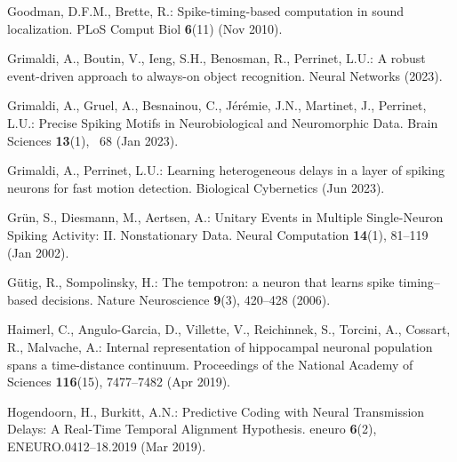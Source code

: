 \documentclass[runningheads]{llncs}
\begin{document}
\begin{thebibliography}{10}
  Goodman, D.F.M., Brette, R.: Spike-timing-based computation in sound localization. PLoS Comput Biol  \textbf{6}(11) (Nov 2010). %
  
  Grimaldi, A., Boutin, V., Ieng, S.H., Benosman, R., Perrinet, L.U.: A robust event-driven approach to always-on object recognition. Neural Networks  (2023). %
  
  Grimaldi, A., Gruel, A., Besnainou, C., Jérémie, J.N., Martinet, J., Perrinet, L.U.: Precise {Spiking} {Motifs} in {Neurobiological} and {Neuromorphic} {Data}. Brain Sciences  \textbf{13}(1), ~68 (Jan 2023). %
  
  Grimaldi, A., Perrinet, L.U.: Learning heterogeneous delays in a layer of spiking neurons for fast motion detection. Biological Cybernetics  (Jun 2023). %
  
  Grün, S., Diesmann, M., Aertsen, A.: Unitary {Events} in {Multiple} {Single}-{Neuron} {Spiking} {Activity}: {II}. {Nonstationary} {Data}. Neural Computation  \textbf{14}(1),  81--119 (Jan 2002). %
  
  Gütig, R., Sompolinsky, H.: The tempotron: a neuron that learns spike timing–based decisions. Nature Neuroscience  \textbf{9}(3),  420--428 (2006). %
  
  Haimerl, C., Angulo-Garcia, D., Villette, V., Reichinnek, S., Torcini, A., Cossart, R., Malvache, A.: Internal representation of hippocampal neuronal population spans a time-distance continuum. Proceedings of the National Academy of Sciences  \textbf{116}(15),  7477--7482 (Apr 2019). %
  
  Hogendoorn, H., Burkitt, A.N.: Predictive {Coding} with {Neural} {Transmission} {Delays}: {A} {Real}-{Time} {Temporal} {Alignment} {Hypothesis}. eneuro  \textbf{6}(2),  ENEURO.0412--18.2019 (Mar 2019). %
  

\end{thebibliography}
\end{document}
